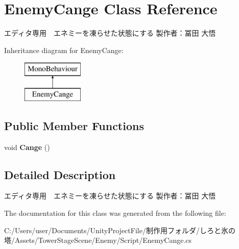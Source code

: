 \hypertarget{class_enemy_cange}{}\section{Enemy\+Cange Class Reference}
\label{class_enemy_cange}


エディタ専用　エネミーを凍らせた状態にする 製作者：冨田 大悟  


Inheritance diagram for Enemy\+Cange\+:\begin{figure}[H]
\begin{center}
\leavevmode
\includegraphics[height=2.000000cm]{class_enemy_cange}
\end{center}
\end{figure}
\subsection*{Public Member Functions}
\begin{DoxyCompactItemize}
\item 
\mbox{\label{class_enemy_cange_acce1a9bb093f58c048f7fc7cb2bd2d44}} 
void {\bfseries Cange} ()
\end{DoxyCompactItemize}


\subsection{Detailed Description}
エディタ専用　エネミーを凍らせた状態にする 製作者：冨田 大悟 



The documentation for this class was generated from the following file\+:\begin{DoxyCompactItemize}
\item 
C\+:/\+Users/user/\+Documents/\+Unity\+Project\+File/制作用フォルダ/しろと氷の塔/\+Assets/\+Tower\+Stage\+Scene/\+Enemy/\+Script/Enemy\+Cange.\+cs\end{DoxyCompactItemize}
